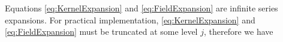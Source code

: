 \documentclass[journal,a4paper]{IEEEtran}
\begin{document}
Equations \eqref{eq:KernelExpansion} and \eqref{eq:FieldExpansion} are infinite series expansions. For practical implementation,  \eqref{eq:KernelExpansion} and \eqref{eq:FieldExpansion} must be truncated at some level $j$, therefore we have
\end{document}
